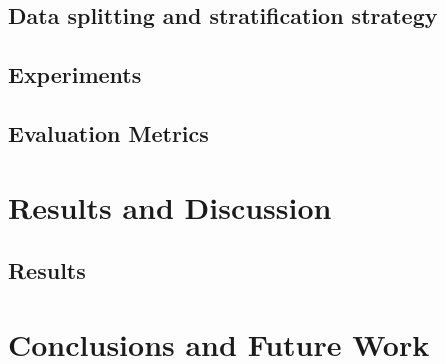 \documentclass[a4paper,10pt]{book}
\begin{document}
\section{Data splitting and stratification strategy}
\section{Experiments}

\section{Evaluation Metrics}

\chapter{Results and Discussion}
\section{Results}

\chapter{Conclusions and Future Work}

\backmatter
{}


\end{document}
